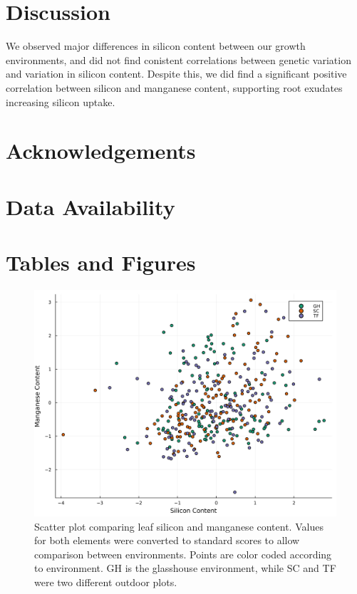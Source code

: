 \documentclass[12pt, letterpaper, ]{report}
\begin{document}
\section{Discussion}

We observed major differences in silicon content between our growth environments, and did not find conistent correlations between genetic variation and variation in silicon content. Despite this, we did find a significant positive correlation between silicon and manganese content, supporting root exudates increasing silicon uptake. 

\section{Acknowledgements}

\section{Data Availability}

\printbibliography

\section{Tables and Figures}

\begin{figure}[h]
        \includegraphics[scale=0.048]{images/si_mn_regression.png}
        \centering
        \caption{Scatter plot comparing leaf silicon and manganese content. Values for both elements were converted to standard scores to allow
        comparison between environments. Points are color coded according to environment. GH is the glasshouse environment, while SC and TF were two different outdoor plots.}
        \label{Fig:mn_si_regression}
\end{figure}
\end{document}
